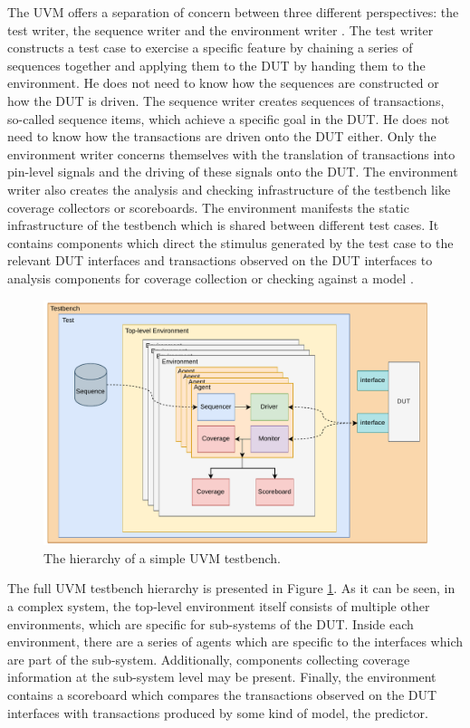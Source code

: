 \documentclass[11pt,a4paper]{report}
\begin{document}
The UVM offers a separation of concern between three different perspectives: the test writer, the sequence writer and
the environment writer \cite{sutherland2015uvm}. The test writer constructs a test case to exercise a specific
feature by chaining a series of sequences together and applying them to the DUT by handing them to the environment.
He does not need to know how the sequences are constructed or how the DUT is driven. The sequence writer creates
sequences of transactions, so-called sequence items, which achieve a specific goal in the DUT. He does not need to
know how the transactions are
driven onto the DUT either. Only the environment writer concerns themselves with the translation of transactions into
pin-level signals and the driving of these signals onto the DUT. The environment writer also creates the analysis and
checking infrastructure of the testbench like coverage collectors or scoreboards. The environment manifests the
static infrastructure of the testbench which is shared between different test cases. It contains components which
direct the stimulus generated by the test case to the relevant DUT interfaces and transactions observed on the DUT
interfaces to analysis components for coverage
collection or checking against a model \cite{sutherland2015uvm}.


\begin{figure}
\centering
\includegraphics[width=\textwidth]{diagrams/uvm_structure.pdf}
\caption{The hierarchy of a simple UVM testbench.}
\label{fig:uvm_tb}
\end{figure}

The full UVM testbench hierarchy is presented in Figure \ref{fig:uvm_tb}. As it can be seen, in a complex system, the top-level environment itself consists of multiple other environments, which are specific for sub-systems of the DUT. Inside each environment, there are a series of agents which are specific to the interfaces which are part of the sub-system. Additionally, components collecting coverage information at the sub-system level may be present. Finally, the environment contains a scoreboard which compares the transactions observed on the DUT interfaces with transactions produced by some kind of model, the predictor.
\end{document}
